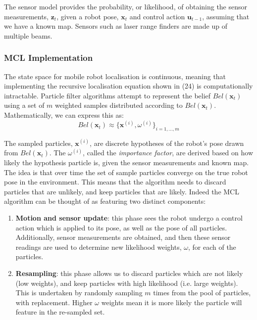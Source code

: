 \documentclass[a4paper]{article}
\begin{document}
The sensor model provides the probability, or likelihood, of obtaining the sensor measurements, $\mathbf{z}_t$, given a robot pose, $\mathbf{x}_t$ and control action $\mathbf{u}_{t-1}$, assuming that we have a known map. Sensors such as laser range finders are made up of multiple beams.

\subsubsection{MCL Implementation}
The state space for mobile robot localisation is continuous, meaning that implementing the recursive localisation equation shown in (24) is computationally intractable. Particle filter algorithms attempt to represent the belief $Bel(\mathbf{x}_t)$ using a set of $m$ weighted samples distributed according to $Bel(\mathbf{x}_t)$. Mathematically, we can express this as:
\begin{equation}
Bel(\mathbf{x}_t) \approx \{\mathbf{x}^{(i)}, \omega^{(i)} \}_{i=1,...,m}
\end{equation}

The sampled particles, $\mathbf{x}^{(i)}$, are discrete hypotheses of the robot's pose drawn from $Bel(\mathbf{x}_t)$. The $\omega^{(i)}$, called the \textit{importance factor}, are derived based on how likely the hypothesis particle is, given the sensor measurements and known map. The idea is that over time the set of sample particles converge on the true robot pose in the environment. This means that the algorithm needs to discard particles that are unlikely, and keep particles that are likely. Indeed the MCL algorithm can be thought of as featuring two distinct components:
\begin{enumerate}
\item \textbf{Motion and sensor update}: this phase sees the robot undergo a control action which is applied to its pose, as well as the pose of all particles. Additionally, sensor measurements are obtained, and then these sensor readings are used to determine new likelihood weights, $\omega$, for each of the particles.
\item \textbf{Resampling}: this phase allows us to discard particles which are not likely (low weights), and keep particles with high likelihood (i.e. large weights). This is undertaken by randomly sampling $m$ times from the pool of particles, with replacement. Higher $\omega$ weights mean it is more likely the particle will feature in the re-sampled set.
\end{enumerate}
\end{document}

